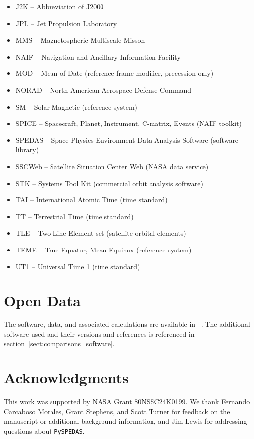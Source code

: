 \documentclass[draft]{agujournal2019}
\begin{document}
\begin{itemize}
\item J2K -- Abbreviation of J2000
\item JPL -- Jet Propulsion Laboratory
\item MMS -- Magnetospheric Multiscale Misson 
\item NAIF -- Navigation and Ancillary Information Facility 
\item MOD -- Mean of Date (reference frame modifier, precession only)
\item NORAD -- North American Aerospace Defense Command
\item SM -- Solar Magnetic (reference system)
\item SPICE -- Spacecraft, Planet, Instrument, C-matrix, Events (NAIF toolkit)
\item SPEDAS -- Space Physics Environment Data Analysis Software (software library)
\item SSCWeb -- Satellite Situation Center Web (NASA data service)
\item STK -- Systems Tool Kit (commercial orbit analysis software)
\item TAI -- International Atomic Time (time standard)
\item TT -- Terrestrial Time (time standard)
\item TLE -- Two-Line Element set (satellite orbital elements)
\item TEME -- True Equator, Mean Equinox (reference system)
\item UT1 -- Universal Time 1 (time standard)
\end{itemize}

\section{Open Data}

The software, data, and associated calculations are available in ~\cite{Weigel2025}. The additional software used and their versions and references is referenced in section~\ref{sect:comparisons_software}.

\section{Acknowledgments}

This work was supported by NASA Grant 80NSSC24K0199. We thank Fernando Carcaboso Morales, Grant Stephens, and Scott Turner for feedback on the manuscript or additional background information, and Jim Lewis for addressing questions about \texttt{PySPEDAS}. 



\end{document}
